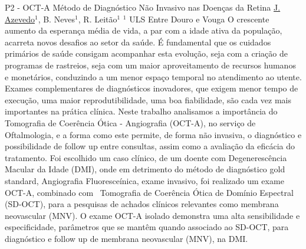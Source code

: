 
    \begin{abstract_online}{P2 - OCT-A Método de Diagnóstico Não Invasivo nas Doenças da Retina}{%
        \underline{J. Azevedo}$^{1}$, B. Neves$^{1}$, R. Leitão$^{1}$}{%
        }{%
        $^1$ ULS Entre Douro e Vouga\newline{}}
        O crescente aumento da esperança média de vida, a par com a idade ativa da população, acarreta novos desafios ao setor da saúde. É fundamental que os cuidados primários de saúde consigam acompanhar esta evolução, seja com a criação de programas de rastreios, seja com um maior aproveitamento de recursos humanos e monetários, conduzindo a um menor espaço temporal no atendimento ao utente. Exames complementares de diagnósticos inovadores, que exigem menor tempo de execução, uma maior reprodutibilidade, uma boa fiabilidade, são cada vez mais importantes na prática clínica. Neste trabalho analisamos a importância do Tomografia de Coerência Ótica - Angiografia (OCT-A), no serviço de Oftalmologia, e a forma como este permite, de forma não invasiva, o diagnóstico e possibilidade de follow up entre consultas, assim como a avaliação da eficácia do tratamento. Foi escolhido um caso clínico, de um doente com Degenerescência Macular da Idade (DMI), onde em detrimento do método de diagnóstico gold standard, Angiografia Fluoresceínica, exame invasivo, foi realizado um exame OCT-A, combinado com  Tomografia de Coerência Ótica de Domínio Espectral (SD-OCT), para a pesquisas de achados clínicos relevantes como membrana neovascular (MNV). O exame OCT-A isolado demonstra uma alta sensibilidade e especificidade, parâmetros que se mantêm quando associado ao SD-OCT, para diagnóstico e follow up de membrana neovascular (MNV), na DMI.
    \end{abstract_online}
    
